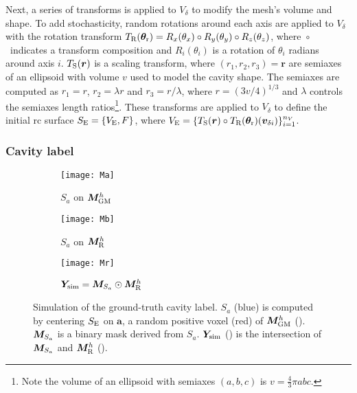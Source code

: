 Next, a series of transforms is applied to $V_{\delta}$ to modify the mesh's volume and shape.
To add stochasticity, random rotations around each axis are applied to $V_{\delta}$ with the rotation transform
$T_{\textnormal{R}}(\bm{\theta}_{\textnormal{r}}) = R_x(\theta_x) \circ R_y(\theta_y) \circ R_z(\theta_z)$,
where~$\circ$~indicates a transform composition and
$R_i(\theta_i)$ is a rotation of $\theta_i$ radians around axis $i$.
$T_{\textnormal{S}}(\bm{r})$ is a scaling transform,
where $(r_1, r_2, r_3) = \bm{r}$ are semiaxes of an ellipsoid
with volume $v$ used to model the cavity shape.
The semiaxes are computed as
$r_1 = r$, $r_2 = \lambda r$ and $r_3 = r /\lambda$,
where $r = (3 v / 4)^{1/3}$ and
$\lambda$ controls the semiaxes length ratios\footnote{
  Note the volume of an ellipsoid with semiaxes $(a, b, c)$ is $v = \frac{4}{3} \pi a b c$.
}.
These transforms are applied to $V_{\delta}$ to define the initial \ac{rc} surface $S_{\textnormal{E}} = \{ V_{\textnormal{E}}, F \}$, where
$V_{\textnormal{E}} =
\{
  T_{\textnormal{S}}(\bm{r})
  \circ T_{\textnormal{R}}(\bm{\theta}_{\textnormal{r}})(
    \bm{v}_{\delta i})
\}
_{i = 1}^{n_V}
$.


\subsubsection{Cavity label}
\label{sec:cavity_constrain}


\begin{figure}
  \centering
  \begin{subfigure}{0.3\textwidth}
    \texttt{[image: Ma]}
    \caption{$S_a$ on $\bm{M}_{\textnormal{GM}}^h$\label{fig:sama}}
  \end{subfigure}
  \begin{subfigure}{0.3\textwidth}
    \texttt{[image: Mb]}
    \caption{$S_a$ on $\bm{M}_{\textnormal{R}}^h$\label{fig:samb}}
  \end{subfigure}
  \begin{subfigure}{0.3\textwidth}
    \texttt{[image: Mr]}
    \caption{$\bm{Y}_{\textnormal{sim}} = \bm{M}_{S_a} \odot \bm{M}_{\textnormal{R}}^h$\label{fig:mr}}
  \end{subfigure}

  \caption[Simulation of the ground-truth cavity label]{
    Simulation of the ground-truth cavity label.
    $S_a$ (blue) is computed by centering $S_{\textnormal{E}}$ on $\bm{a}$, a random positive voxel (red) of $\bm{M}_{\textnormal{GM}}^h$ ().
    $\bm{M}_{S_a}$ is a binary mask derived from $S_a$.
    $\bm{Y}_{\textnormal{sim}}$ () is the intersection of $\bm{M}_{S_a}$ and $\bm{M}_{\textnormal{R}}^h$ ().
  }
  \label{fig:shape}
\end{figure}



